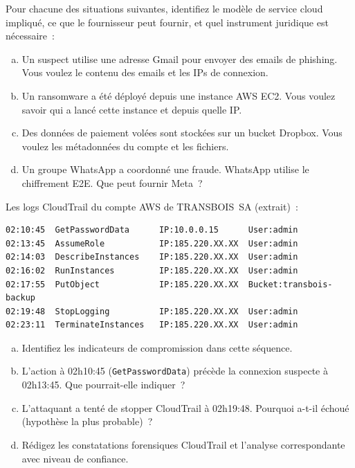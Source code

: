 \bigskip

\begin{boxexo}[title={\ding{45}\quad Exercice~17.1 --- Modèle et preuves \niveaubase}]
Pour chacune des situations suivantes, identifiez le modèle de service
cloud impliqué, ce que le fournisseur peut fournir, et quel instrument
juridique est nécessaire~:
\begin{enumerate}[(a)]
    \item Un suspect utilise une adresse Gmail pour envoyer des emails
          de phishing. Vous voulez le contenu des emails et les IPs
          de connexion.
    \item Un ransomware a été déployé depuis une instance AWS EC2.
          Vous voulez savoir qui a lancé cette instance et depuis quelle IP.
    \item Des données de paiement volées sont stockées sur un bucket
          Dropbox. Vous voulez les métadonnées du compte et les fichiers.
    \item Un groupe WhatsApp a coordonné une fraude. WhatsApp utilise
          le chiffrement E2E. Que peut fournir Meta~?
\end{enumerate}
\end{boxexo}

\begin{boxexo}[title={\ding{45}\quad Exercice~17.2 --- Analyse CloudTrail \niveaumoyen}]
Les logs CloudTrail du compte AWS de TRANSBOIS~SA (extrait)~:
\begin{lstlisting}[language=bash_forensique]
02:10:45  GetPasswordData      IP:10.0.0.15      User:admin
02:13:45  AssumeRole           IP:185.220.XX.XX  User:admin
02:14:03  DescribeInstances    IP:185.220.XX.XX  User:admin
02:16:02  RunInstances         IP:185.220.XX.XX  User:admin
02:17:55  PutObject            IP:185.220.XX.XX  Bucket:transbois-backup
02:19:48  StopLogging          IP:185.220.XX.XX  User:admin
02:23:11  TerminateInstances   IP:185.220.XX.XX  User:admin
\end{lstlisting}
\begin{enumerate}[(a)]
    \item Identifiez les indicateurs de compromission dans cette séquence.
    \item L'action à 02h10:45 (\texttt{GetPasswordData}) précède
          la connexion suspecte à 02h13:45. Que pourrait-elle indiquer~?
    \item L'attaquant a tenté de stopper CloudTrail à 02h19:48.
          Pourquoi a-t-il échoué (hypothèse la plus probable)~?
    \item Rédigez les constatations forensiques CloudTrail et
          l'analyse correspondante avec niveau de confiance.
\end{enumerate}
\end{boxexo}

